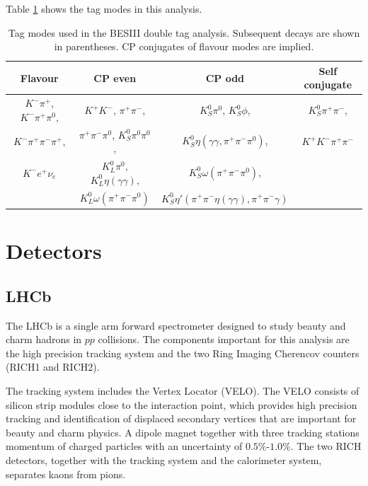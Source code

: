 \documentclass[12pt, a4paper, notitlepage, onecolumn]{article}
\numberwithin{equation}{section}
\begin{document}
Table \ref{table_tag_modes} shows the tag modes in this analysis.

\begin{table}[H]
  \centering
  \caption{Tag modes used in the BESIII double tag analysis. Subsequent decays are shown in parentheses. CP conjugates of flavour modes are implied.}
  \label{table_tag_modes}
  \begin{tabular}{cccc} 
    \toprule
    Flavour & CP even & CP odd & Self conjugate \\
    \midrule
    $K^-\pi^+$, $K^-\pi^+\pi^0$, & $K^+K^-$, $\pi^+\pi^-$,                  & $K_S^0\pi^0$, $K_S^0\phi$,                  & $K_S^0\pi^+\pi^-$, \\
    $K^-\pi^+\pi^-\pi^+$,        & $\pi^+\pi^-\pi^0$, $K_S^0\pi^0\pi^0$,    & $K_S^0\eta(\gamma\gamma, \pi^+\pi^-\pi^0)$, & $K^+K^-\pi^+\pi^-$ \\
    $K^- e^+\nu_e$               & $K_L^0\pi^0$, $K_L^0\eta(\gamma\gamma)$, & $K_S^0\omega(\pi^+\pi^-\pi^0)$,             & \\
                                 & $K_L^0\omega(\pi^+\pi^-\pi^0)$           & $K_S^0\eta'(\pi^+\pi^-\eta(\gamma\gamma), \pi^+\pi^-\gamma)$  & \\
    \bottomrule
  \end{tabular}
\end{table}
\section{Detectors}
\subsection{LHCb}
\noindent The LHCb \cite{cite_LHCb} is a single arm forward spectrometer designed to study beauty and charm hadrons in $pp$ collisions. The components important for this analysis are the high precision tracking system and the two Ring Imaging Cherencov counters (RICH1 and RICH2).

The tracking system includes the Vertex Locator (VELO). The VELO consists of silicon strip modules close to the interaction point, which provides high precision tracking and identification of displaced secondary vertices that are important for beauty and charm physics. A dipole magnet together with three tracking stations momentum of charged particles with an uncertainty of $0.5\%$-$1.0\%$. The two RICH detectors, together with the tracking system and the calorimeter system, separates kaons from pions.
\end{document}
